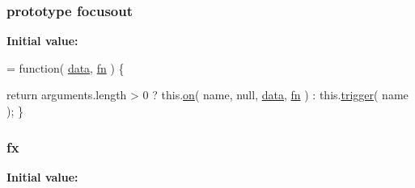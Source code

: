 \hypertarget{jquery-1_810_82-vsdoc_8js_ac5fd3487b99e86d52fbef52f40d31565}{
\subsubsection[{focusout}]{ {\bf prototype} focusout}}\label{jquery-1_810_82-vsdoc_8js_ac5fd3487b99e86d52fbef52f40d31565}
{\bfseries Initial value\-:}
\begin{DoxyCode}
= \textcolor{keyword}{function}( \hyperlink{jquery-1_810_82-vsdoc_8js_a609407b3456fdc3c5671a9fc4a226ff7}{data}, \hyperlink{jquery-1_810_82-vsdoc_8js_acef6bdaf6b9b20fdcca1ea86f0902c3b}{fn} ) \{


        \textcolor{keywordflow}{return} arguments.length > 0 ?
            this.\hyperlink{jquery-1_810_82-vsdoc_8js_ae453b412b883f60220d73468ef6c6dbc}{on}( name, null, \hyperlink{jquery-1_810_82-vsdoc_8js_a609407b3456fdc3c5671a9fc4a226ff7}{data}, \hyperlink{jquery-1_810_82-vsdoc_8js_acef6bdaf6b9b20fdcca1ea86f0902c3b}{fn} ) :
            this.\hyperlink{jquery-1_810_82-vsdoc_8js_a2388c4114d5e3e4eab020f973641519c}{trigger}( name );
    \}
\end{DoxyCode}
\hypertarget{jquery-1_810_82-vsdoc_8js_afbcf56cb9545c8bc885722b4fe4253ce}{
\subsubsection[{fx}]{ fx}}\label{jquery-1_810_82-vsdoc_8js_afbcf56cb9545c8bc885722b4fe4253ce}
{\bfseries Initial value\-:}
